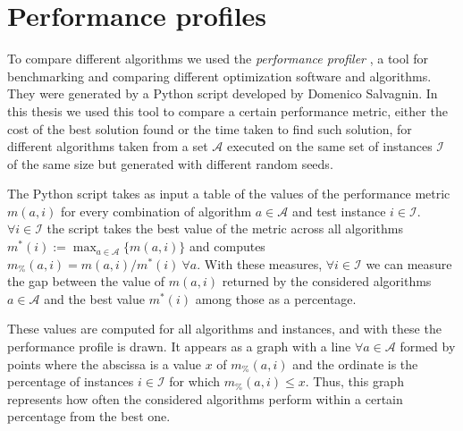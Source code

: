 \section{Performance profiles}

To compare different algorithms we used the \textit{performance profiler} \cite{Dolan2002}, a tool for benchmarking and comparing different optimization software and algorithms. They were generated by a Python script developed by Domenico Salvagnin. In this thesis we used this tool to compare a certain performance metric, either the cost of the best solution found or the time taken to find such solution, for different algorithms taken from a set $\mathcal{A}$ executed on the same set of instances $\mathcal{I}$ of the same size but generated with different random seeds.

The Python script takes as input a table of the values of the performance metric $m(a,i)$ for every combination of algorithm $a\in \mathcal{A}$ and test instance $i\in \mathcal{I}$. $\forall i\in \mathcal{I}$ the script takes the best value of the metric across all algorithms $m^*(i):=\max_{a\in\mathcal{A}}\{m(a,i)\}$ and computes $m_\%(a,i)=m(a,i)/m^*(i) \ \forall a$. With these measures, $\forall i\in \mathcal{I}$ we can measure the gap between the value of $m(a,i)$ returned by the considered algorithms $a\in\mathcal{A}$ and the best value $m^*(i)$ among those as a percentage.

These values are computed for all algorithms and instances, and with these the performance profile is drawn. It appears as a graph with a line $\forall a\in\mathcal{A}$ formed by points where the abscissa is a value $x$ of $m_\%(a,i)$ and the ordinate is the percentage of instances $i\in\mathcal{I}$ for which $m_\%(a,i)\leq x$. Thus, this graph represents how often the considered algorithms perform within a certain percentage from the best one.